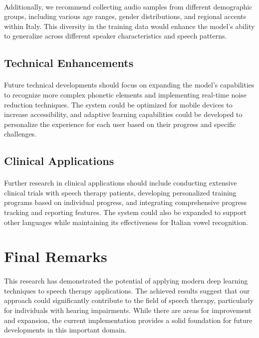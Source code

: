 \paragraph{}
Additionally, we recommend collecting audio samples from different demographic groups, including various age ranges, gender distributions, and regional accents within Italy. This diversity in the training data would enhance the model's ability to generalize across different speaker characteristics and speech patterns.

\subsection{Technical Enhancements}
\label{subsec:technical-future}

\paragraph{}
Future technical developments should focus on expanding the model's capabilities to recognize more complex phonetic elements and implementing real-time noise reduction techniques. The system could be optimized for mobile devices to increase accessibility, and adaptive learning capabilities could be developed to personalize the experience for each user based on their progress and specific challenges.

\subsection{Clinical Applications}
\label{subsec:clinical-future}

\paragraph{}
Further research in clinical applications should include conducting extensive clinical trials with speech therapy patients, developing personalized training programs based on individual progress, and integrating comprehensive progress tracking and reporting features. The system could also be expanded to support other languages while maintaining its effectiveness for Italian vowel recognition.

\section{Final Remarks}
\label{sec:final-remarks}

\paragraph{}
This research has demonstrated the potential of applying modern deep learning techniques to speech therapy applications. The achieved results suggest that our approach could significantly contribute to the field of speech therapy, particularly for individuals with hearing impairments. While there are areas for improvement and expansion, the current implementation provides a solid foundation for future developments in this important domain.

